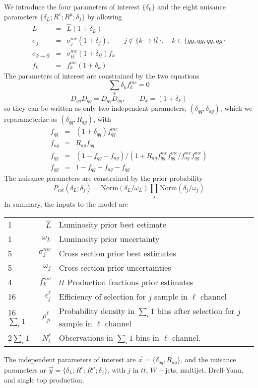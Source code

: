 \documentclass{article}
\begin{document}
We introduce the four parameters of interest $\{\delta_k\}$ and the
eight nuisance parameters $\{\delta_L;R^e;R^\mu;\delta_j\}$ by
allowing
\begin{eqnarray}
  L &=& \hat{L}(1+\delta_L) \\
  \sigma_j &=& \sigma_j^{mc}(1+\delta_j),\qquad j\notin \{k\to t\bar{t}\}, \quad k\in\{gg,qg,q\bar{q},\bar{q}g\}\\
  \sigma_{k\to t\bar{t}} &=& \sigma_{t\bar{t}}^{mc}(1+\delta_{t\bar{t}}) f_k\\
  f_k &=& f_k^{mc}(1+\delta_k)
\end{eqnarray}
The parameters of interest are constrained by the two equations
\begin{equation}
  \sum_k \delta_kf_k^{mc} = 0
\end{equation}
\begin{equation}
  D_{gg}D_{q\bar{q}} = D_{qg}D_{\bar{q}g}, \qquad D_k = (1+\delta_k)
\end{equation}
so they can be written as only two independent parameters,
$(\delta_{qq},\delta_{ag})$, which we reparameterize as
$(\delta_{qq},R_{ag})$, with
\begin{eqnarray}
  f_{qq} &=& (1+\delta_{qq})f_{qq}^{mc}\\
  f_{ag} &=& R_{ag}f_{qq}\\
  f_{qg} &=& (1-f_{qq}-f_{ag})/(1+R_{ag}f_{gg}^{mc}f_{qq}^{mc}/f_{ag}^{mc}f_{qg}^{mc})\\
  f_{gg} &=& 1 - f_{qq} - f_{ag} - f_{qg}
\end{eqnarray}
The nuisance parameters are constrained by the prior probability
\begin{equation}
  P_{cst}(\delta_L;\delta_j) = \mathrm{Norm}(\delta_L/\omega_L)\prod_j\mathrm{Norm}(\delta_j/\omega_j)
\end{equation}
In summary, the inputs to the model are
\begin{center}
  \begin{tabular}{lrl}
    1&$\hat{L}$ & Luminosity prior best estimate \\
    1&$\omega_L$ & Luminosity prior uncertainty\\
    5&$\sigma_j^{mc}$ & Cross section prior best estimates\\
    5&$\omega_j$ & Cross section prior uncertainties\\
    4&$f^{mc}_k$ & $t\bar{t}$ Production fractions prior estimates\\
    16&$\epsilon_j^\ell$ & Efficiency of selection for $j$ sample in $\ell$ channel\\
    16$\sum_i1$&$\rho_{ji}^\ell$ & Probability density in $\sum_i1$ bins after selection for $j$ sample in $\ell$ channel\\
    2$\sum_i1$&$N_i^\ell$ & Observations in $\sum_i1$ bins in $\ell$ channel.
  \end{tabular}
\end{center}
The independent parameters of interest are $\vec{x} =
\{\delta_{qq},R_{ag}\}$, and the nuisance parameters ar $\vec{y}
= \{\delta_L;R^e;R^\mu;\delta_j\}$, with $j$ in $t\bar{t}$, $W+$jets, multijet,
Drell-Yann, and single top production.
\end{document}
